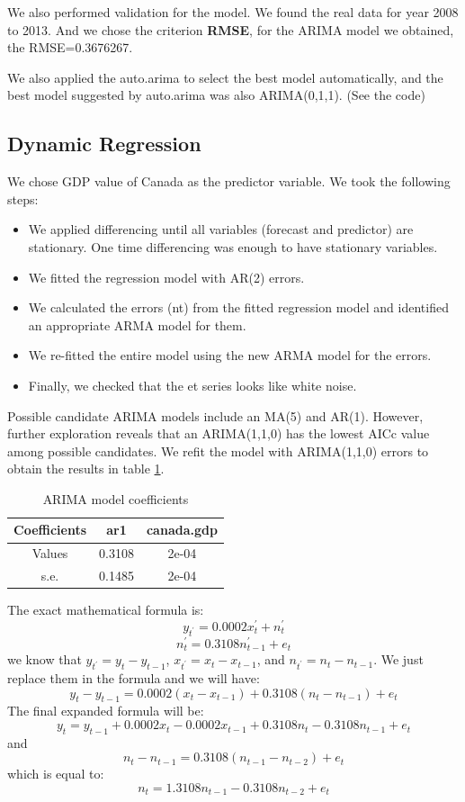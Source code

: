 \documentclass[journal, a4paper]{IEEEtran}
\begin{document}
We also performed validation for the model. We found the real data for year 2008 to 2013. \cite{worldbank} And we chose the criterion \textbf{RMSE}, for the ARIMA model we obtained, the RMSE=0.3676267.

We also applied the auto.arima to select the best model automatically, and the best model suggested by auto.arima was also ARIMA(0,1,1). (See the code)




\subsection{Dynamic Regression}

We chose GDP value of Canada as the predictor variable. We took the following steps:
\begin{itemize}
\item We applied differencing until all variables (forecast and predictor) are stationary. One time differencing was enough to have stationary variables. 
\item We fitted the regression model with AR(2) errors. 
\item We calculated the errors (nt) from the fitted regression model and identified an appropriate ARMA model for them.
\item We re-fitted the entire model using the new ARMA model for the errors. 
\item  Finally, we checked that the et series looks like white noise. 
\end{itemize}


Possible candidate ARIMA models include an MA(5) and AR(1). However, further exploration reveals that an ARIMA(1,1,0) has the lowest AICc value among possible candidates. We refit the model with ARIMA(1,1,0) errors to obtain the results in table \ref{table:arima_coeff}. 
\begin{table}[H]
\caption{ARIMA model coefficients}
\label{table:arima_coeff}
\centering
\begin{tabular}{|c|c|c|}
\hline
Coefficients & ar1 & canada.gdp \\ \hline
Values & 0.3108 & 2e-04 \\ \hline
s.e. & 0.1485 & 2e-04 \\
\hline
\end{tabular}
\end{table}

The exact mathematical formula is:
$$y_{t^{'}}=0.0002x_{t}^{'}+n_{t}^{'}$$
$$n_{t}^{'}=0.3108n_{t-1}^{'}+e_{t}$$
we know that $y_{t^{'}}=y_{t}-y_{t-1}$, $x_{t^{'}}=x_{t}-x_{t-1}$, and $n_{t^{'}}=n_{t}-n_{t-1}$. We just replace them in the formula and we will have:\\
$$y_{t}-y_{t-1}=0.0002(x_{t}-x_{t-1})+0.3108(n_{t}-n_{t-1})+e_{t}$$
The final expanded formula will be:\\
$$y_{t}=y_{t-1}+0.0002x_{t}-0.0002x_{t-1}+0.3108n_{t}-0.3108n_{t-1}+e_{t}$$
and
$$n_{t}-n_{t-1}=0.3108(n_{t-1}-n_{t-2})+e_{t}$$
which is equal to:
$$n_{t}=1.3108n_{t-1}-0.3108n_{t-2}+e_{t}$$
\end{document}
